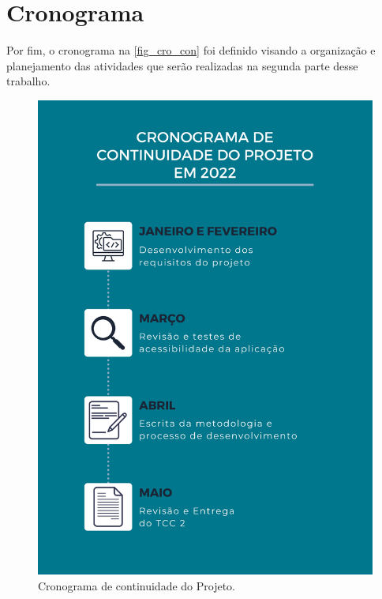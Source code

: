 \newpage

\section{Cronograma}

Por fim, o cronograma na \autoref{fig_cro_con} foi definido visando a organização e planejamento das atividades que serão realizadas
na segunda parte desse trabalho.

\begin{figure}[htb]
    \caption{\label{fig_cro_con}Cronograma de continuidade do Projeto.}
    \begin{center}
        \includegraphics[scale=0.65]{Imagens/proposta/cronograma_continuidade.png}
    \end{center}
\end{figure}